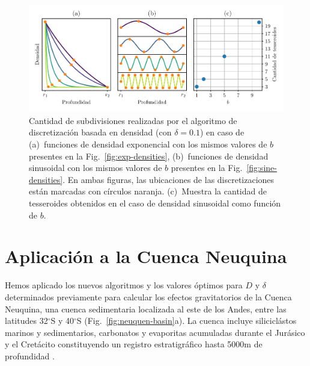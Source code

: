 \begin{figure}
\centering
\includegraphics[width=\linewidth]{figs/tesseroids-variable-density/number-of-tesseroids.pdf}
\caption{
    Cantidad de subdivisiones realizadas por el algoritmo de discretización
    basada en densidad (con $\delta = 0.1$) en caso de
    (a)~funciones de densidad exponencial con los mismos valores de $b$
    presentes en la Fig.~\ref{fig:exp-densities},
    (b)~funciones de densidad sinusoidal con los mismos valores de $b$
    presentes en la Fig.~\ref{fig:sine-densities}.
    En ambas figuras, las ubicaciones de las discretizaciones están marcadas
    con círculos naranja.
    (c)~Muestra la cantidad de tesseroides obtenidos en el caso de densidad
    sinusoidal como función de $b$.
}
\label{fig:number-of-tesseroids}
\end{figure}



\section{Aplicación a la Cuenca Neuquina}

Hemos aplicado los nuevos algoritmos y los valores óptimos para $D$
y $\delta$ determinados previamente para calcular los efectos gravitatorios de
la Cuenca Neuquina, una cuenca sedimentaria localizada al este de los Andes,
entre las latitudes 32$^\circ$S y 40$^\circ$S (Fig.~\ref{fig:neuquen-basin}a).
La cuenca incluye siliciclástos marinos y sedimentarios, carbonatos
y evaporitas acumuladas durante el Jurásico y el Cretácito constituyendo un
registro estratigráfico hasta 5000m de profundidad \citep{howell2005}.

